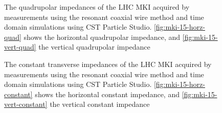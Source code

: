 \begin{figure}
\subfigure[]{
\label{fig:mki-15-horz-quad}
}
\subfigure[]{
\label{fig:mki-15-vert-quad}
}
\label{fig:mki-15-quadrupolar}
\caption{The quadrupolar impedances of the LHC MKI acquired by measurements using the resonant coaxial wire method and time domain simulations using CST Particle Studio. \ref{fig:mki-15-horz-quad} shows the horizontal quadrupolar impedance, and \ref{fig:mki-15-vert-quad} the vertical quadrupolar impedance}
\end{figure}

\begin{figure}
\subfigure[]{
\label{fig:mki-15-horz-constant}
}
\subfigure[]{
\label{fig:mki-15-vert-constant}
}
\label{fig:mki-15-constant}
\caption{The constant transverse impedances of the LHC MKI acquired by measurements using the resonant coaxial wire method and time domain simulations using CST Particle Studio. \ref{fig:mki-15-horz-constant} shows the horizontal constant impedance, and \ref{fig:mki-15-vert-constant} the vertical constant impedance}
\end{figure}
